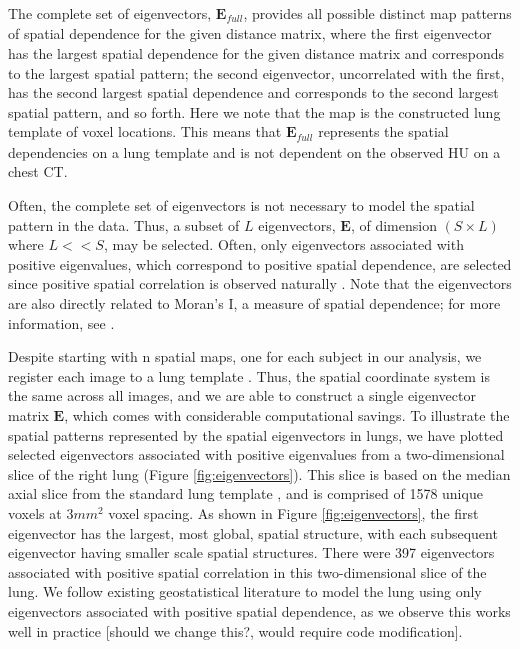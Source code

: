 \documentclass[12pt]{article}
\begin{document}
The complete set of eigenvectors, $\mathbf{E}_\textit{full}$, provides all possible distinct map patterns of spatial dependence for the given distance matrix, where the first eigenvector has the largest spatial dependence for the given distance matrix and corresponds to the largest spatial pattern; the second eigenvector, uncorrelated with the first, has the second largest spatial dependence and corresponds to the second largest spatial pattern, and so forth. Here we note that the map is the constructed lung template of voxel locations. This means that $\mathbf{E}_\textit{full}$ represents the spatial dependencies on a lung template and is not dependent on the observed HU on a chest CT.

Often, the complete set of eigenvectors is not necessary to model the spatial pattern in the data. Thus, a subset of $L$ eigenvectors, $\mathbf{E}$, of dimension $(S \times L)$ where $L<<S$, may be selected. Often, only eigenvectors associated with positive eigenvalues, which correspond to positive spatial dependence, are selected since positive spatial correlation is observed naturally \citep{griffith2014spatial, griffith2006spatial, chun2014quality}. Note that the eigenvectors are also directly related to Moran's I, a measure of spatial dependence; for more information, see \cite{murakami2019eigenvector}. 

Despite starting with n spatial maps, one for each subject in our analysis, we register each image to a lung template \citep{ryan2019template}. Thus, the spatial coordinate system is the same across all images, and we are able to construct a single eigenvector matrix $\mathbf{E}$, which comes with considerable computational savings. To illustrate the spatial patterns represented by the spatial eigenvectors in lungs, we have plotted selected eigenvectors associated with positive eigenvalues from a two-dimensional slice of the right lung (Figure \ref{fig:eigenvectors}). This slice is based on the median axial slice from the standard lung template \citep{ryan2019template}, and is comprised of 1578 unique voxels at $3mm^2$ voxel spacing. As shown in Figure \ref{fig:eigenvectors}, the first eigenvector has the largest, most global, spatial structure, with each subsequent eigenvector having smaller scale spatial structures. There were 397 eigenvectors associated with positive spatial correlation in this two-dimensional slice of the lung. We follow existing geostatistical literature \citep{griffith2014spatial, griffith2006spatial, chun2014quality} to model the lung using only eigenvectors associated with positive spatial dependence, as we observe this works well in practice [should we change this?, would require code modification].
\end{document}
